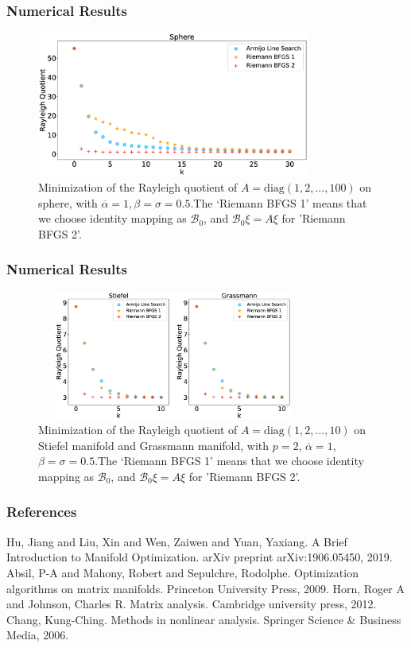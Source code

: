 \documentclass[notheorems,envcountsect,pdfpagemode=FullScreen,12pt]{beamer}
\theoremstyle{plain}
\theoremstyle{definition}
\theoremstyle{example}
\begin{document}
\begin{frame}
\frametitle{Numerical Results}
\begin{figure}[h]
\centering
\includegraphics[width=0.8\textwidth]{1.eps}
\caption{\small Minimization of the Rayleigh quotient of $A=\mathrm{diag}(1,2,\dots,100)$ on sphere, with $\overline{\alpha}=1, \beta=\sigma=0.5$.\newline The `Riemann BFGS 1' means that we choose identity mapping as $\mathcal{B}_0$, and $\mathcal{B}_0\xi=A\xi$ for 'Riemann BFGS 2'.}
\end{figure}
\end{frame}

\begin{frame}
\frametitle{Numerical Results}
\begin{figure}[H]
\centering
\includegraphics[width=0.8\textwidth, height=120pt]{2.eps}
\caption{Minimization of the Rayleigh quotient of $A=\mathrm{diag}(1,2,\dots,10)$ on Stiefel manifold and Grassmann manifold, with $p=2$, $\overline{\alpha}=1$, $\beta=\sigma=0.5$.\newline The `Riemann BFGS 1' means that we choose identity mapping as $\mathcal{B}_0$, and $\mathcal{B}_0\xi=A\xi$ for 'Riemann BFGS 2'.}
\end{figure}
\end{frame}

\begin{frame}
\frametitle{References}
\begin{thebibliography}{99}
 Hu, Jiang and Liu, Xin and Wen, Zaiwen and Yuan, Yaxiang. A Brief Introduction to Manifold Optimization. arXiv preprint arXiv:1906.05450, 2019.
 Absil, P-A and Mahony, Robert and Sepulchre, Rodolphe. Optimization algorithms on matrix manifolds. Princeton University Press, 2009.
 Horn, Roger A and Johnson, Charles R. Matrix analysis. Cambridge university press, 2012.
 Chang, Kung-Ching. Methods in nonlinear analysis. Springer Science \& Business Media, 2006.
\end{thebibliography}
\end{frame}
\end{document}

